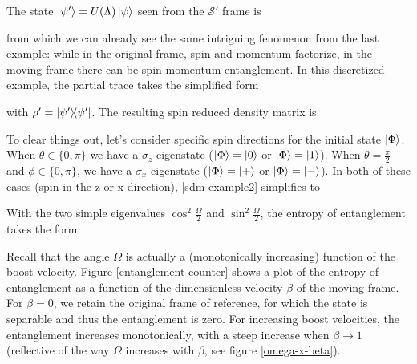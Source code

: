 \documentclass[12pt,a4paper,notitlepage]{report}
\begin{document}
%

The state $\ket{\psi'} = U(\Lambda)\ket{\psi}$ seen from the $\mathcal{S}'$ frame is

%
from which we can already see the same intriguing fenomenon from the last example: while in the original frame, spin and momentum factorize, in the moving frame there can be spin-momentum entanglement. In this discretized example, the partial trace takes the simplified form

%
with $\rho' = \dyad{\psi'}$. The resulting spin reduced density matrix is

%
To clear things out, let's consider specific spin directions for the initial state $\ket{\Phi}$. When $\theta \in \{0, \pi\}$ we have a $\sigma_z$ eigenstate ($\ket{\Phi} = \ket{0}$ or $\ket{\Phi} = \ket{1}$). When $\theta = \frac{\pi}{2}$ and $\phi \in \{0, \pi\}$, we have a $\sigma_x$ eigenstate ($\ket{\Phi} = \ket{+}$ or $\ket{\Phi} = \ket{-}$). In both of these cases (spin in the z or x direction), \eqref{sdm-example2} simplifies to

%
With the two simple eigenvalues $\cos^2\frac{\Omega}{2}$ and $\sin^2\frac{\Omega}{2}$, the entropy of entanglement takes the form

%
Recall that the angle $\Omega$ is actually a (monotonically increasing) function of the boost velocity. Figure \ref{entanglement-counter} shows a plot of the entropy of entanglement as a function of the dimensionless velocity $\beta$ of the moving frame. For $\beta = 0$, we retain the original frame of reference, for which the state is separable and thus the entanglement is zero. For increasing boost velocities, the entanglement increases monotonically, with a steep increase when $\beta \rightarrow 1$ (reflective of the way $\Omega$ increases with $\beta$, see figure \ref{omega-x-beta}).
\end{document}
